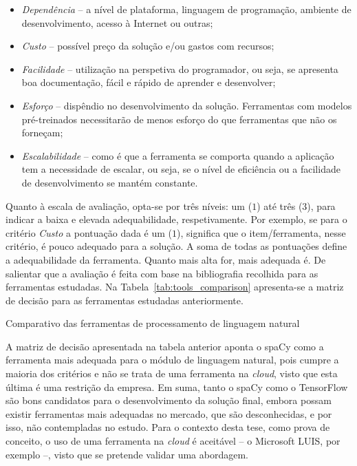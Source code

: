 \begin{itemize}
    \item
    {
        \textit{Dependência} -- a nível de plataforma, linguagem de programação, ambiente de desenvolvimento, acesso à Internet ou outras;
    }
    \item
    {
        \textit{Custo} -- possível preço da solução e/ou gastos com recursos;  
    }
    \item
    {
        \textit{Facilidade} -- utilização na perspetiva do programador, ou seja, se apresenta boa documentação, fácil e rápido de aprender e desenvolver;
    }
    \item
    {
        \textit{Esforço} -- dispêndio no desenvolvimento da solução. Ferramentas com modelos pré-treinados necessitarão de menos esforço do que ferramentas que não os forneçam;
    }
    \item
    {
        \textit{Escalabilidade} -- como é que a ferramenta se comporta quando a aplicação tem a necessidade de escalar, ou seja, se o nível de eficiência ou a facilidade de desenvolvimento se mantém constante.
    }
\end{itemize}

Quanto à escala de avaliação, opta-se por três níveis: um ($1$) até três ($3$), para indicar a baixa e elevada adequabilidade, respetivamente. Por exemplo, se para o critério \textit{Custo} a pontuação dada é um ($1$), significa que o item/ferramenta, nesse critério, é pouco adequado para a solução. A soma de todas as pontuações define a adequabilidade da ferramenta. Quanto mais alta for, mais adequada é. De salientar que a avaliação é feita com base na bibliografia recolhida para as ferramentas estudadas. Na Tabela~\ref{tab:tools_comparison} apresenta-se a matriz de decisão para as ferramentas estudadas anteriormente.

\begin{table}[!ht]
\caption{Comparativo das ferramentas de processamento de linguagem natural}
\label{tab:tools_comparison}
\centering
\resizebox{\textwidth}{!}{}
\end{table}

A matriz de decisão apresentada na tabela anterior aponta o spaCy como a ferramenta mais adequada para o módulo de linguagem natural, pois cumpre a maioria dos critérios e não se trata de uma ferramenta na \textit{cloud}, visto que esta última é uma restrição da empresa. Em suma, tanto o spaCy como o TensorFlow são bons candidatos para o desenvolvimento da solução final, embora possam existir ferramentas mais adequadas no mercado, que são desconhecidas, e por isso, não contempladas no estudo. Para o contexto desta tese, como prova de conceito, o uso de uma ferramenta na \textit{cloud} é aceitável -- o Microsoft LUIS, por exemplo --, visto que se pretende validar uma abordagem.
